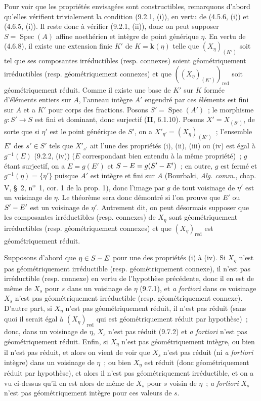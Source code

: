 Pour voir que les propriétés envisagées sont constructibles, remarquons d'abord
qu'elles vérifient trivialement la condition (9.2.1, (i)), en vertu de
(4.5.6, (i)) et (4.6.5, (i)). Il reste donc à vérifier (9.2.1, (ii)), donc on
peut supposer $S=\operatorname{Spec}(A)$ affine noethérien et intègre de point
générique $\eta$. En vertu de (4.6.8), il existe une extension finie $K'$ de
$K=\boldsymbol{k}(\eta)$ telle que $(X_\eta)_{(K')}$ soit tel que ses
composantes irréductibles (resp. connexes) soient géométriquement irréductibles
(resp. géométriquement connexes) et que $((X_\eta)_{(K')})_{\mathrm{red}}$ soit
géométriquement réduit. Comme il existe une base de $K'$ sur $K$ formée
d'éléments entiers sur $A$, l'anneau intègre $A'$ engendré par ces éléments est
fini sur $A$ et a $K'$ pour corps des fractions. Posons
$S'=\operatorname{Spec}(A')$~; le morphisme $g:S'\to S$ est fini et dominant,
donc surjectif (\textbf{II}, 6.1.10). Posons $X'=X_{(S')}$, de sorte que si
$\eta'$ est le point générique de $S'$, on a
$X'_{\eta'}=(X_\eta)_{(K')}$~; l'ensemble $E'$ des $s'\in S'$ tels que
$X'_{s'}$ ait l'une des propriétés (i), (ii), (iii) ou (iv) est égal à
$g^{-1}(E)$ (9.2.2, (iv)) ($E$ correspondant bien entendu à la même propriété)~;
$g$ étant surjectif, on a $E=g(E')$ et $S- E=g(S'- E')$~; en outre, $g$ est fermé
et $g^{-1}(\eta)=\{\eta'\}$ puisque $A'$ est intègre et fini sur $A$ (Bourbaki,
\emph{Alg. comm.}, chap. V, \S~2, n\textsuperscript{o}~1, cor. 1 de la prop. 1), donc
l'image par $g$ de tout voisinage de $\eta'$ est un voisinage de $\eta$. Le
théorème sera donc démontré si l'on prouve que $E'$ ou $S'- E'$ est un voisinage
de $\eta'$. Autrement dit, on peut désormais supposer que les composantes
irréductibles (resp. connexes) de $X_\eta$ sont géométriquement
irréductibles (resp. géométriquement connexes) et que $(X_\eta)_{\mathrm{red}}$
est géométriquement réduit.

Supposons d'abord que $\eta\in S- E$ pour une des propriétés (i) à (iv). Si
$X_\eta$ n'est pas géométriquement irréductible (resp. géométriquement connexe),
il n'est pas irréductible (resp. connexe) en vertu de l'hypothèse précédente,
donc il en est de même de $X_s$ pour $s$ dans un voisinage de $\eta$ (9.7.1), et
\emph{a fortiori} dans ce voisinage $X_s$ n'est pas géométriquement irréductible
(resp. géométriquement connexe). D'autre part, si $X_\eta$ n'est pas
géométriquement réduit, il n'est pas réduit (sans quoi il serait égal à
$(X_\eta)_{\mathrm{red}}$ qui est géométriquement réduit par hypothèse)~; donc,
dans un voisinage de $\eta$, $X_s$ n'est pas réduit (9.7.2) et \emph{a fortiori}
n'est pas géométriquement réduit. Enfin, si $X_\eta$ n'est pas géométriquement
intègre, ou bien il n'est pas réduit, et alors on vient de voir que $X_s$ n'est
pas réduit (ni \emph{a fortiori} intègre) dans un voisinage de $\eta$~; ou bien
$X_\eta$ est réduit (donc géométriquement réduit par hypothèse), et alors il
n'est pas géométriquement irréductible, et on a vu ci-dessus qu'il en est alors
de même de $X_s$ pour $s$ voisin de $\eta$~; \emph{a fortiori} $X_s$ n'est pas
géométriquement intègre pour ces valeurs de $s$.

